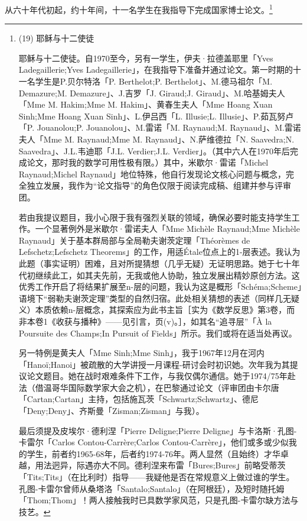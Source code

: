 从六十年代初起，约十年间，十一名学生在我指导下完成国家博士论文。\footnote{(19) 耶稣与十二使徒 \par 耶稣与十二使徒。自1970至今，另有一学生，伊夫·拉德盖耶里「Yves Ladegaillerie;Yves Ladegaillerie」，在我指导下准备并通过论文。第一时期的十一名学生是P.贝尔特洛「P. Berthelot;P. Berthelot」、M.德马祖尔「M. Demazure;M. Demazure」、J.吉罗「J. Giraud;J. Giraud」、M.哈基姆夫人「Mme M. Hakim;Mme M. Hakim」、黄春生夫人「Mme Hoang Xuan Sinh;Mme Hoang Xuan Sinh」、L.伊吕西「L. Illusie;L. Illusie」、P.茹瓦努卢「P. Jouanolou;P. Jouanolou」、M.雷诺「M. Raynaud;M. Raynaud」、M.雷诺夫人「Mme M. Raynaud;Mme M. Raynaud」、N.萨维德拉「N. Saavedra;N. Saavedra」、J.L.韦迪耶「J.L. Verdier;J.L. Verdier」。（其中六人在1970年后完成论文，那时我的数学可用性极有限。）其中，米歇尔·雷诺「Michel Raynaud;Michel Raynaud」地位特殊，他自行发现论文核心问题与概念，完全独立发展，我作为“论文指导”的角色仅限于阅读完成稿、组建并参与评审团。

若由我提议题目，我小心限于我有强烈关联的领域，确保必要时能支持学生工作。一个显著例外是米歇尔·雷诺夫人「Mme Michèle Raynaud;Mme Michèle Raynaud」关于基本群局部与全局勒夫谢茨定理「Théorèmes de Lefschetz;Lefschetz Theorems」的工作，用适Étale位点上的1-层表述。我认为此题（事实证明）困难，且对所提猜想（几乎无疑）无证明思路。她于七十年代初继续此工，如其夫先前，无我或他人协助，独立发展出精妙原创方法。这优秀工作开启了将结果扩展至n-层的问题，我认为这是概形「Schéma;Scheme」语境下“弱勒夫谢茨定理”类型的自然归宿。此处相关猜想的表述（同样几无疑义）本质依赖n-层概念，其探索应为此书主旨［实为《数学反思》第3卷，而非本卷1《收获与播种》——见引言，页(v)。］，如其名“追寻层”「À la Poursuite des Champs;In Pursuit of Fields」所示。我们或将在适当处再议。

另一特例是黄夫人「Mme Sinh;Mme Sinh」，我于1967年12月在河内「Hanoï;Hanoi」被疏散的大学讲授一月课程-研讨会时初识她。次年我为其提议论文题目。她在战时艰难条件下工作，与我仅偶尔通信。她于1974/75年赴法（借温哥华国际数学家大会之机），在巴黎通过论文（评审团由卡尔唐「Cartan;Cartan」主持，包括施瓦茨「Schwartz;Schwartz」、德尼「Deny;Deny」、齐斯曼「Zisman;Zisman」与我）。

最后须提及皮埃尔·德利涅「Pierre Deligne;Pierre Deligne」与卡洛斯·孔图-卡雷尔「Carlos Contou-Carrère;Carlos Contou-Carrère」，他们或多或少似我的学生，前者约1965-68年，后者约1974-76年。两人显然（且始终）才华卓越，用法迥异，际遇亦大不同。德利涅来布雷「Bures;Bures」前略受蒂茨「Tits;Tits」（在比利时）指导——我疑他是否在常规意义上做过谁的学生。孔图-卡雷尔曾师从桑塔洛「Santalo;Santalo」（在阿根廷），及短时随托姆「Thom;Thom」！两人接触我时已具数学家风范，只是孔图-卡雷尔缺方法与技艺。

}
